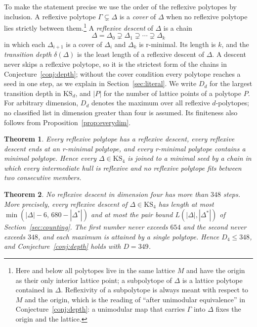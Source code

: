 \documentclass[manuscript]{aomart}
\newtheorem{theorem}{Theorem}
\theoremstyle{definition}
\theoremstyle{remark}
\newcommand{\KS}{\mathrm{KS}}
\newcommand{\UB}{348}
\newcommand{\UBplus}{349}
\begin{document}
To make the statement precise we use the order of the reflexive polytopes
by inclusion. A reflexive polytope $\Gamma\subsetneq\Delta$ is a
\emph{cover} of $\Delta$ when no reflexive polytope lies strictly between
them.\footnote{Here and below all polytopes live in the same lattice $M$
and have the origin as their only interior lattice point; a subpolytope of
$\Delta$ is a lattice polytope contained in $\Delta$. Reflexivity of a
subpolytope is always meant with respect to $M$ and the origin, which is
the reading of ``after unimodular equivalence'' in
Conjecture~\ref{conj:depth}: a unimodular map that carries $\Gamma$ into
$\Delta$ fixes the origin and the lattice.} A \emph{reflexive descent} of
$\Delta$ is a chain
\[
\Delta=\Delta_0\supsetneq\Delta_1\supsetneq\cdots\supsetneq\Delta_k
\]
in which each $\Delta_{i+1}$ is a cover of $\Delta_i$ and $\Delta_k$ is
r-minimal. Its length is $k$, and the \emph{transition depth}
$\delta(\Delta)$ is the least length of a reflexive descent of $\Delta$.
A descent never skips a reflexive polytope, so it is the strictest form of
the chains in Conjecture~\ref{conj:depth}; without the cover condition
every polytope reaches a seed in one step, as we explain in
Section~\ref{sec:literal}. We write $D_d$ for the largest transition depth
in $\KS_d$, and $|P|$ for the number of lattice points of a polytope $P$.
For arbitrary dimension, $D_d$ denotes the maximum over all reflexive
$d$-polytopes; no classified list in dimension greater than four is
assumed. Its finiteness also follows from Proposition~\ref{prop:everydim}.

\begin{theorem}\label{thm:A}
Every reflexive polytope has a reflexive descent, every reflexive descent
ends at an r-minimal polytope, and every r-minimal polytope contains a
minimal polytope. Hence every $\Delta\in\KS_4$ is joined to a minimal seed
by a chain in which every intermediate hull is reflexive and no reflexive
polytope fits between two consecutive members.
\end{theorem}

\begin{theorem}\label{thm:B}
No reflexive descent in dimension four has more than $\UB$ steps. More
precisely, every reflexive descent of $\Delta\in\KS_4$ has length at most
$\min(|\Delta|-6,\,680-|\Delta^*|)$ and at most the pair bound
$L(|\Delta|,|\Delta^*|)$ of Section~\ref{sec:counting}. The first number
never exceeds $654$ and the second never exceeds $\UB$, and each maximum
is attained by a single polytope. Hence $D_4\le\UB$, and
Conjecture~\ref{conj:depth} holds with $D=\UBplus$.
\end{theorem}
\end{document}
